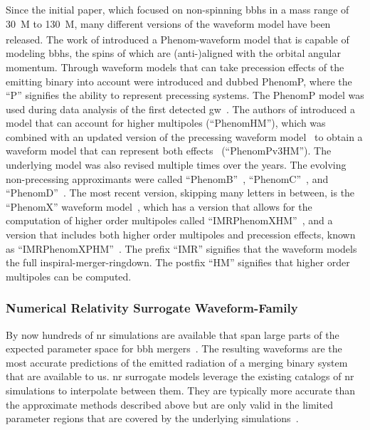 Since the initial paper, which focused on non-spinning \acrshort{bbh}s in a mass range of \SI{30}{M_\odot} to \SI{130}{M_\odot}, many different versions of the waveform model have been released. The work of \cite{Ajith:2009bn} introduced a Phenom-waveform model that is capable of modeling \acrshort{bbh}s, the spins of which are (anti-)aligned with the orbital angular momentum. Through \cite{Schmidt:2012rh, Hannam:2013oca} waveform models that can take precession effects of the emitting binary into account were introduced and dubbed PhenomP, where the ``P'' signifies the ability to represent precessing systems. The PhenomP model was used during data analysis of the first detected \acrshort{gw}~\cite{LIGOScientific:2016aoc, LIGOScientific:2016vlm, LIGOScientific:2019hgc}. The authors of \cite{London:2017bcn} introduced a model that can account for higher multipoles (``PhenomHM''), which was combined with an updated version of the precessing waveform model~\cite{Khan:2018fmp} to obtain a waveform model that can represent both effects~\cite{Khan:2019kot} (``PhenomPv3HM''). The underlying model was also revised multiple times over the years. The evolving non-precessing approximants were called ``PhenomB''~\cite{Ajith:2009bn}, ``PhenomC''~\cite{Santamaria:2010yb}, and ``PhenomD''~\cite{Husa:2015iqa, Khan:2015jqa}. The most recent version, skipping many letters in between, is the ``PhenomX'' waveform model~\cite{Pratten:2020fqn}, which has a version that allows for the computation of higher order multipoles called ``IMRPhenomXHM''~\cite{Garcia-Quiros:2020qpx}, and a version that includes both higher order multipoles and precession effects, known as ``IMRPhenomXPHM''~\cite{Pratten:2020ceb}. The prefix ``IMR'' signifies that the waveform models the full inspiral-merger-ringdown. The postfix ``HM'' signifies that higher order multipoles can be computed.


\subsubsection{Numerical Relativity Surrogate Waveform-Family}
By now hundreds of \acrshort{nr} simulations are available that span large parts of the expected parameter space for \acrshort{bbh} mergers~\cite{Boyle:2019kee, Healy:2022wdn}. The resulting waveforms are the most accurate predictions of the emitted radiation of a merging binary system that are available to us. \acrshort{nr} surrogate models leverage the existing catalogs of \acrshort{nr} simulations to interpolate between them. They are typically more accurate than the approximate methods described above but are only valid in the limited parameter regions that are covered by the underlying simulations~\cite{Setyawati:2019xzw}.

